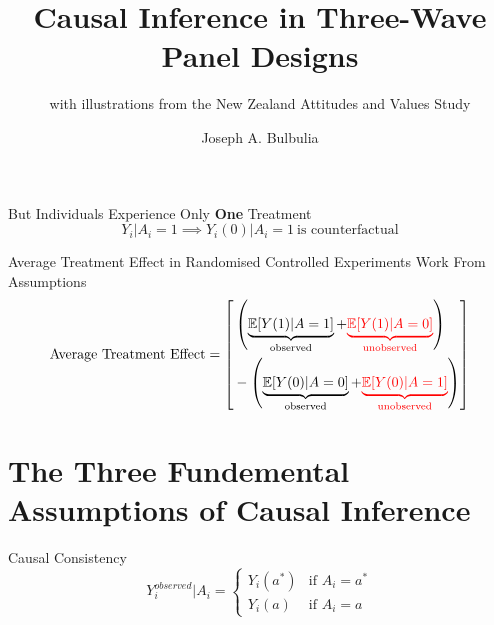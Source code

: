 \documentclass[
  ignorenonframetext,
  aspectratio=169,
]{beamer}
\title{Causal Inference in Three-Wave Panel Designs}
\subtitle{with illustrations from the New Zealand Attitudes and Values
Study}
\author{Joseph A. Bulbulia}
\date{}
\institute{Joseph.Bulbulia@vuw.ac.nz (Victoria University)}
\begin{document}
\frame{\titlepage}


\begin{frame}{But Individuals Experience Only \textbf{One} Treatment}
\label{but-individuals-experience-only-one-treatment}
\[
Y_i|A_i = 1 \implies Y_i(0)|A_i = 1~ \text{is counterfactual}
\]
\end{frame}

\begin{frame}{Average Treatment Effect in Randomised Controlled
Experiments Work From Assumptions}
\label{average-treatment-effect-in-randomised-controlled-experiments-work-from-assumptions}
\[
\text{Average Treatment Effect} = \left[ \begin{aligned}
&\left( \underbrace{\mathbb{E}[Y(1)|A = 1]}_{\text{observed}} + \textcolor{red}{\underbrace{\mathbb{E}[Y(1)|A = 0]}_{\text{unobserved}}} \right) \\
&- \left( \underbrace{\mathbb{E}[Y(0)|A = 0]}_{\text{observed}} + \textcolor{red}{\underbrace{\mathbb{E}[Y(0)|A = 1]}_{\text{unobserved}}} \right)
\end{aligned} \right]
\]
\end{frame}

\section{The Three Fundemental Assumptions of Causal
Inference}\label{the-three-fundemental-assumptions-of-causal-inference}

\begin{frame}{Causal Consistency}
\label{causal-consistency}
\[
Y_i^{observed}|A_i = 
\begin{cases} 
Y_i(a^*) & \text{if } A_i = a^* \\
Y_i(a) & \text{if } A_i = a
\end{cases}
\]
\end{frame}

\end{document}
